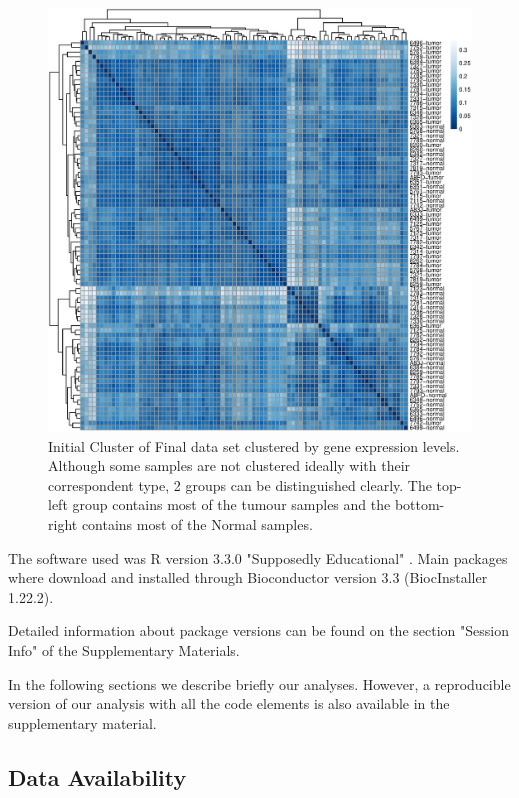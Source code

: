 \documentclass[9pt,twocolumn,twoside]{gsajnl}
\begin{document}
\begin{figure}[!h]
\centering
\includegraphics[width=\textwidth]{Clustering.eps}
\caption{Initial Cluster of Final data set clustered by gene expression levels. Although some samples are not clustered ideally with their correspondent type, 2 groups can be distinguished clearly. The top-left group contains most of the tumour samples and the bottom-right contains most of the Normal samples.
}
\label{fig:Clustering}
\end{figure}

The software used was R version 3.3.0 "Supposedly Educational" \cite{R}. Main packages where download and installed through Bioconductor version 3.3 (BiocInstaller 1.22.2)\cite{bioconductor}.

Detailed information about package versions can be found on the section "Session Info" of the Supplementary Materials.

In the following sections we describe briefly our analyses. However, a reproducible version of our analysis with all the code elements is also available in the supplementary material.

\subsection*{Data Availability}
\end{document}
